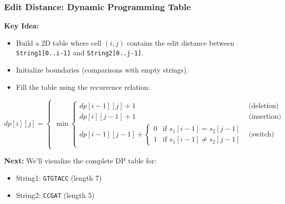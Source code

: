 \documentclass[10pt,aspectratio=43]{beamer}
\begin{document}
\begin{frame}
    \frametitle{Edit Distance: Dynamic Programming Table}
    
    \textbf{Key Idea:}
    \begin{itemize}
        \item Build a 2D table where cell $(i,j)$ contains the edit distance between\\
              \texttt{String1[0..i-1]} and \texttt{String2[0..j-1]}.
        \item Initialize boundaries (comparisons with empty strings).
        \item Fill the table using the recurrence relation:
    \end{itemize}
    
    \vspace{0.2cm}
    \begin{center}
    \footnotesize
    \[
    dp[i][j] = \begin{cases} 
        \min\begin{cases} 
            dp[i-1][j] + 1 & \text{(deletion)} \\ 
            dp[i][j-1] + 1 & \text{(insertion)} \\ 
            dp[i-1][j-1] +  
            \begin{cases} 
                0 & \text{if } s_1[i-1] = s_2[j-1] \\ 
                1 & \text{if } s_1[i-1] \neq s_2[j-1] 
            \end{cases} & \text{(switch)} 
        \end{cases} 
    \end{cases}
    \]
    \end{center}
    
    \vspace{0.3cm}
    \textbf{Next:} We'll visualize the complete DP table for:
    \begin{itemize}
        \item String1: \texttt{GTGTACC} (length 7)
        \item String2: \texttt{CCGAT} (length 5)
    \end{itemize}
\end{frame}
\end{document}
